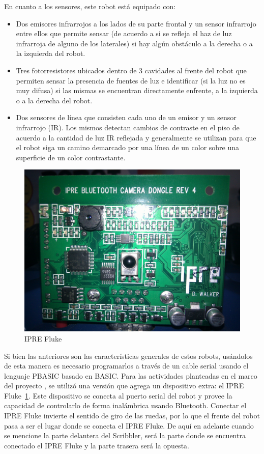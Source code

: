 En cuanto a los sensores, este robot está equipado con:
\begin{itemize}
    \item Dos emisores infrarrojos a los lados de su parte frontal y un
        sensor infrarrojo entre ellos que permite sensar (de acuerdo a si se
        refleja el haz de luz infrarroja de alguno de los laterales) si
        hay algún obstáculo a la derecha o a la izquierda del robot.
    \item Tres fotorresistores ubicados dentro de 3 cavidades al frente del
        robot que permiten sensar la presencia de fuentes de luz e
        identificar (si la luz no es muy difusa) si las mismas se encuentran
        directamente enfrente, a la izquierda o a la derecha del robot.
    \item Dos sensores de línea que consisten cada uno de un emisor
        y un sensor infrarrojo (IR). Los mismos detectan cambios de contraste
        en el piso de acuerdo a la cantidad de luz IR reflejada y generalmente
        se utilizan para que el robot siga un camino demarcado por una línea
        de un color sobre una superficie de un color contrastante.
\end{itemize}

\begin{figure}
    \centering
    \includegraphics[width=0.5\linewidth]{figures/fluke}
    \caption{IPRE Fluke}
    \label{fig:foto_fluke}
\end{figure}

Si bien las anteriores son las características generales de estos robots, usándolos
de esta manera es necesario programarlos a través de un cable serial usando el
lenguaje PBASIC basado en BASIC. Para las actividades planteadas en el marco del
proyecto \proyecto{}, se utilizó  una versión
que agrega un dispositivo extra: el IPRE Fluke~\ref{fig:foto_fluke}.
Este dispositivo se conecta al puerto
serial del robot y provee la capacidad de controlarlo de forma inalámbrica
usando Bluetooth.  Conectar el
IPRE Fluke invierte el sentido de giro de las ruedas, por lo que el frente
del robot pasa a ser el lugar donde se conecta el IPRE Fluke. De aquí
en adelante cuando se mencione la parte delantera del Scribbler, será la
parte donde se encuentra conectado el IPRE Fluke y la parte trasera será la
opuesta.

